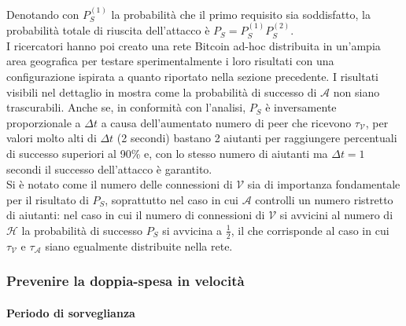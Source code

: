 Denotando con $P^{\left(1\right)}_S$ la probabilità che il primo requisito sia soddisfatto, la probabilità totale di riuscita dell'attacco è $P_S = P^{\left(1\right)}_S P^{\left(2\right)}_S$.\\
I ricercatori hanno poi creato una rete Bitcoin ad-hoc distribuita in un'ampia area geografica per testare sperimentalmente i loro risultati con una configurazione ispirata a quanto riportato nella sezione precedente. I risultati visibili nel dettaglio in \cite{doublespendig_fast} mostra come la probabilità di successo di $\mathcal{A}$ non siano trascurabili. Anche se, in conformità con l'analisi, $P_S$ è inversamente proporzionale a $\Delta t$ a causa dell'aumentato numero di peer che ricevono $\tau_\mathcal{V}$, per valori molto alti di $\Delta t$ (2 secondi) bastano 2 aiutanti per raggiungere percentuali di successo superiori al 90\% e, con lo stesso numero di aiutanti ma $\Delta t = 1$ secondi il successo dell'attacco è garantito.\\
Si è notato come il numero delle connessioni di $\mathcal{V}$ sia di importanza fondamentale per il risultato di $P_S$, soprattutto nel caso in cui $\mathcal{A}$ controlli un numero ristretto di aiutanti: nel caso in cui il numero di connessioni di $\mathcal{V}$ si avvicini al numero di $\mathcal{H}$ la probabilità di successo $P_S$ si avvicina a $\frac{1}{2}$, il che corrisponde al caso in cui $\tau_\mathcal{V}$ e $\tau_\mathcal{A}$ siano egualmente distribuite nella rete.

\subsubsection{Prevenire la doppia-spesa in velocità}\label{prevenzione-doppia-spesa}

\paragraph{Periodo di sorveglianza}

